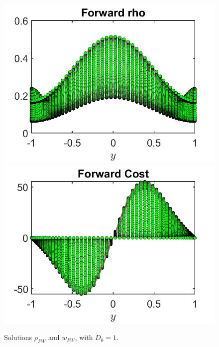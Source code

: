 \documentclass[11pt, a4paper]{article}
\theoremstyle{definition}
\begin{document}
\begin{figure}[h]
	\includegraphics[scale=0.3]{wFrhoFW1a.jpg}	\includegraphics[scale=0.3]{wFwFW1a.jpg}
	\caption{Solutions $\rho_{FW}$ and $w_{FW}$,   with $D_0 = 1$.}
	\label{rhoD03a}
\end{figure}
\end{document}
